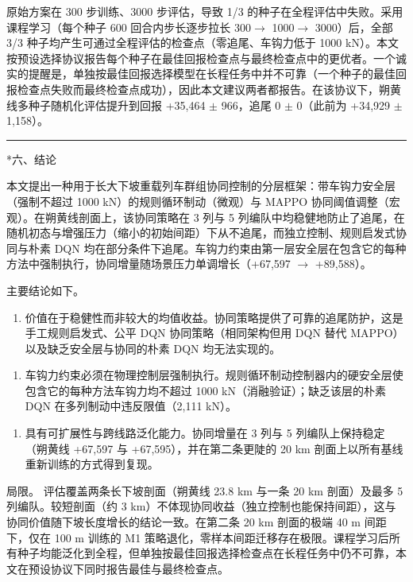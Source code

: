 \documentclass[11pt]{article}
\makeatletter
\renewcommand{\section}{\@startsection{section}{1}{\z@}{-3.5ex \@plus -1ex \@minus -.2ex}{2.3ex \@plus .2ex}{\normalfont\large\bfseries\sffamily}}
\makeatother
\begin{document}
原始方案在 300 步训练、3000 步评估，导致 1/3 的种子在全程评估中失败。采用课程学习（每个种子 600 回合内步长逐步拉长 300$\rightarrow$ 1000$\rightarrow$ 3000）后，全部 3/3 种子均产生可通过全程评估的检查点（零追尾、车钩力低于 1000 kN）。本文按预设选择协议报告每个种子在最佳回报检查点与最终检查点中的更优者。一个诚实的提醒是，单独按最佳回报选择模型在长程任务中并不可靠（一个种子的最佳回报检查点失败而最终检查点成功），因此本文建议两者都报告。在该协议下，朔黄线多种子随机化评估提升到回报 +35,464 $\pm$  966，追尾 0 $\pm$  0（此前为 +34,929 $\pm$  1,158）。



\bigskip\hrule\bigskip


\section*{六、结论}


本文提出一种用于长大下坡重载列车群组协同控制的分层框架：带车钩力安全层（强制不超过 1000 kN）的规则循环制动（微观）与 MAPPO 协同阈值调整（宏观）。在朔黄线剖面上，该协同策略在 3 列与 5 列编队中均稳健地防止了追尾，在随机初态与增强压力（缩小的初始间距）下从不追尾，而独立控制、规则启发式协同与朴素 DQN 均在部分条件下追尾。车钩力约束由第一层安全层在包含它的每种方法中强制执行，协同增量随场景压力单调增长（+67,597 $\rightarrow$  +89,588）。



主要结论如下。



\begin{enumerate}
\item 价值在于稳健性而非较大的均值收益。协同策略提供了可靠的追尾防护，这是手工规则启发式、公平 DQN 协同策略（相同架构但用 DQN 替代 MAPPO）以及缺乏安全层与协同的朴素 DQN 均无法实现的。
\end{enumerate}
\begin{enumerate}
\item 车钩力约束必须在物理控制层强制执行。规则循环制动控制器内的硬安全层使包含它的每种方法车钩力均不超过 1000 kN（消融验证）；缺乏该层的朴素 DQN 在多列制动中违反限值（2,111 kN）。
\end{enumerate}
\begin{enumerate}
\item 具有可扩展性与跨线路泛化能力。协同增量在 3 列与 5 列编队上保持稳定（朔黄线 +67,597 与 +67,595），并在第二条更陡的 20 km 剖面上以所有基线重新训练的方式得到复现。
\end{enumerate}


局限。 评估覆盖两条长下坡剖面（朔黄线 23.8 km 与一条 20 km 剖面）及最多 5 列编队。较短剖面（约 3 km）不体现协同收益（独立控制也能保持间距），这与协同价值随下坡长度增长的结论一致。在第二条 20 km 剖面的极端 40 m 间距下，仅在 100 m 训练的 M1 策略退化，零样本间距迁移存在极限。课程学习后所有种子均能泛化到全程，但单独按最佳回报选择检查点在长程任务中仍不可靠，本文在预设协议下同时报告最佳与最终检查点。
\end{document}
